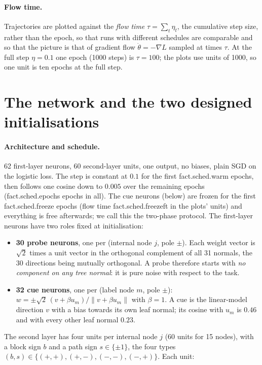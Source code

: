 \documentclass[10pt,a4paper]{article}
\newcommand{\fact}[2]{\csname fact.#1.#2\endcsname}
\begin{document}
\paragraph{Flow time.} Trajectories are plotted against the \emph{flow time} $\tau=\sum_t\eta_t$, the cumulative step size, rather than the epoch, so that runs with different schedules are comparable and so that the picture is that of gradient flow $\dot\theta=-\nabla L$ sampled at times $\tau$. At the full step $\eta=0.1$ one epoch (1000 steps) is $\tau=100$; the plots use units of 1000, so one unit is ten epochs at the full step.

\section{The network and the two designed initialisations}
\paragraph{Architecture and schedule.} 62 first-layer neurons, 60 second-layer units, one output, no biases, plain SGD on the logistic loss. The step is constant at $0.1$ for the first \fact{sched}{warm} epochs, then follows one cosine down to $0.005$ over the remaining epochs (\fact{sched}{epochs} epochs in all). The cue neurons (below) are frozen for the first \fact{sched}{freeze} epochs (flow time \fact{sched}{freezeft} in the plots' units) and everything is free afterwards; we call this the two-phase protocol. The first-layer neurons have two roles fixed at initialisation:
\begin{itemize}[leftmargin=1.4em,itemsep=1pt]
\item \textbf{30 probe neurons}, one per (internal node $j$, pole $\pm$). Each weight vector is $\sqrt2$ times a unit vector in the orthogonal complement of all 31 normals, the 30 directions being mutually orthogonal. A probe therefore starts with \emph{no component on any tree normal}: it is pure noise with respect to the task.
\item \textbf{32 cue neurons}, one per (label node $m$, pole $\pm$): $w=\pm\sqrt2\,(v+\beta u_m)/\|v+\beta u_m\|$ with $\beta=1$. A cue is the linear-model direction $v$ with a bias towards its own leaf normal; its cosine with $u_m$ is $0.46$ and with every other leaf normal $0.23$.
\end{itemize}
The second layer has four units per internal node $j$ (60 units for 15 nodes), with a block sign $b$ and a path sign $s\in\{\pm1\}$, the four types $(b,s)\in\{(+,+),(+,-),(-,-),(-,+)\}$. Each unit:
\end{document}
